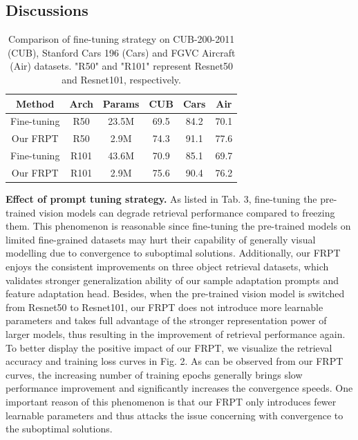 \documentclass[letterpaper]{article} %
\begin{document}
\subsection{Discussions}



\begin{table}\centering

	\begin{tabular}{c|c|c||c|c|c}
		\hline
       \hline
       Method & Arch & Params & CUB & Cars & Air \\


		\hline
		\hline
		Fine-tuning & R50 & 23.5M & 69.5 & 84.2 & 70.1 \\
		Our FRPT  & R50 & 2.9M &74.3 & 91.1& 77.6\\
		Fine-tuning & R101 & 43.6M & 70.9 & 85.1 & 69.7 \\
		Our FRPT  & R101 & 2.9M &75.6 & 90.4& 76.2\\
		\hline
		\hline

\end{tabular}
	\caption{ Comparison of fine-tuning strategy on CUB-200-2011 (CUB),  Stanford Cars 196 (Cars) and FGVC Aircraft (Air) datasets.  "R50" and "R101" represent Resnet50 and Resnet101\cite{He2015Deep}, respectively. %
}
\end{table}







\textbf{Effect of prompt tuning strategy.} As listed in Tab. 3, fine-tuning the pre-trained vision models can degrade retrieval performance compared to freezing them. This phenomenon is reasonable since fine-tuning the pre-trained models on limited fine-grained datasets may hurt their capability of generally visual modelling due to convergence to suboptimal solutions.
Additionally, our FRPT enjoys the consistent improvements on three object retrieval datasets, which validates stronger generalization ability of our sample adaptation prompts and feature adaptation head. Besides, when the pre-trained vision model is switched from Resnet50 to Resnet101, our FRPT does not introduce more learnable parameters and takes full advantage of the stronger representation power of larger models, thus resulting in the improvement of retrieval performance again.
To better display the positive impact of our FRPT, we visualize the retrieval accuracy and training loss curves in Fig. 2. As can be observed from our FRPT curves, the increasing number of training epochs generally brings slow performance improvement and significantly increases the convergence speeds. One important reason of this phenomenon is that our FRPT only introduces fewer learnable parameters and thus attacks the issue concerning with convergence to the suboptimal solutions.
\end{document}
